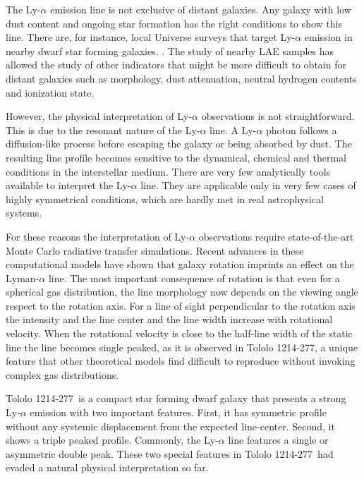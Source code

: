 \documentclass[a4paper, usenatbib, 12pt]{article}
\newcommand{\tol}{Tololo 1214-277}
\begin{document}
{The Ly-$\alpha$ emission line is not exclusive of distant galaxies. 
Any galaxy with low dust content and ongoing star formation has the
right conditions to show this line.  
There are, for instance,  local Universe surveys that target
Ly-$\alpha$ emission in nearby dwarf star forming galaxies. 
\cite{LARS}. 
The study of nearby LAE samples has allowed the study of other
indicators that might be more difficult to obtain for distant galaxies
such as morphology, dust attenuation, neutral hydrogen contents and
ionization state.  

However, the physical interpretation of Ly-$\alpha$ observations is
not straightforward. 
This is due to the resonant nature of the Ly-$\alpha$ line. 
A Ly-$\alpha$ photon follows a diffusion-like process before escaping
the galaxy or being absorbed by dust. 
The resulting line profile becomes sensitive to the dynamical, chemical
and thermal conditions in the interstellar medium. 
There are very few analytically tools available to interpret the
Ly-$\alpha$ line.
They are applicable only in very few cases of highly symmetrical
conditions, which are hardly met in real astrophysical systems.

For these reasons the interpretation of Ly-$\alpha$ observations
require state-of-the-art Monte Carlo radiative transfer simulations.   
Recent advances in these computational models
\cite{GaravitoCamargo2014} have shown that galaxy rotation imprints an
effect on the Lyman-$\alpha$ line.
The most important consequence of rotation is that even for a
spherical gas distribution, the line morphology now depends on the
viewing angle respect to the rotation axis.  
For a line of sight perpendicular to the rotation axis the intensity
and the line center and the line width increase with rotational
velocity. 
When the rotational velocity is close to the half-line width of the
static line the line becomes single peaked, as it is observed in
\tol, a unique feature that other theoretical models find
difficult to reproduce without invoking complex gas distributions.

\tol\ is a compact star forming dwarf galaxy that presents a
strong Ly-$\alpha$ emission \cite{Thuan97} with two important
features. 
First, it has symmetric profile  without any systemic displacement
from the expected line-center. 
Second, it shows a triple peaked profile. 
Commonly, the Ly-$\alpha$ line features a single or asymmetric double peak. 
These two special features in \tol\ had evaded a natural physical
interpretation so far.


}
\end{document}
